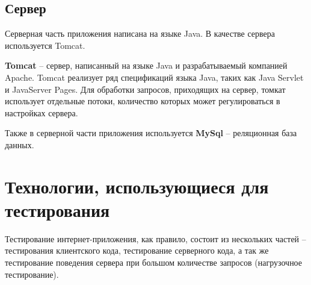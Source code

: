 \subsection{Сервер}
	Серверная часть приложения написана на языке Java. В качестве сервера используется Tomcat.

	\textbf{Tomcat} -- сервер, написанный на языке Java и разрабатываемый компанией Apache. Tomcat реализует ряд спецификаций языка Java, таких как Java Servlet и JavaServer Pages. Для обработки запросов, приходящих на сервер, томкат использует отдельные потоки, количество которых может регулироваться в настройках сервера. 
	
	Также в серверной части приложения используется \textbf{MySql} -- реляционная база данных.
	
\section{Технологии, использующиеся для тестирования}
	Тестирование интернет-приложения, как правило, состоит из нескольких частей -- тестирования клиентского кода, тестирование серверного кода, а так же тестирование поведения сервера при большом количестве запросов (нагрузочное тестирование).
	
